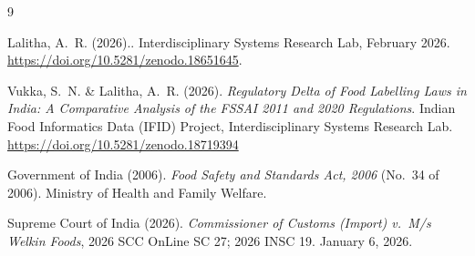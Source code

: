 \documentclass[12pt,a4paper]{article}
\begin{document}
\begin{thebibliography}{9}
\setlength{\itemsep}{0.4em}

Lalitha, A.~R. (2026)..
\newblock Interdisciplinary Systems Research Lab, February 2026.
\newblock \url{https://doi.org/10.5281/zenodo.18651645}.

Vukka, S.~N. \& Lalitha, A.~R. (2026).
\textit{Regulatory Delta of Food Labelling Laws in India: A Comparative
Analysis of the FSSAI 2011 and 2020 Regulations}.
Indian Food Informatics Data (IFID) Project,
Interdisciplinary Systems Research Lab.
\url{https://doi.org/10.5281/zenodo.18719394}

Government of India (2006).
\textit{Food Safety and Standards Act, 2006} (No.\ 34 of 2006).
Ministry of Health and Family Welfare.

Supreme Court of India (2026).
\textit{Commissioner of Customs (Import) v.\ M/s Welkin Foods},
2026 SCC OnLine SC 27; 2026 INSC 19. January 6, 2026.

\end{thebibliography}
\end{document}
